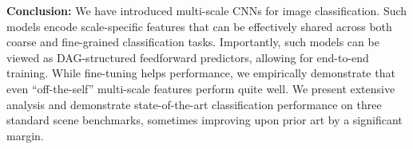 \documentclass[10pt,twocolumn,letterpaper]{article}
\newcommand{\deva}[1]{\textcolor{blue}{[Deva: #1]}}
\begin{document}
{\bf Conclusion:} We have introduced multi-scale CNNs for image classification. Such models encode scale-specific features that can be effectively shared across both coarse and fine-grained classification tasks. Importantly, such models can be viewed as DAG-structured feedforward predictors, allowing for end-to-end training. While fine-tuning helps performance, we empirically demonstrate that even ``off-the-self'' multi-scale features perform quite well. We present extensive analysis and demonstrate state-of-the-art classification performance on three standard scene benchmarks, sometimes improving upon prior art by a significant margin. %
\newpage
{\small


}
\end{document}
